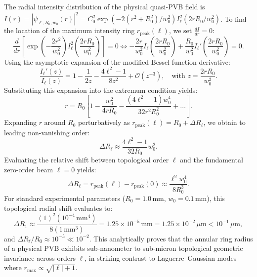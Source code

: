 \documentclass[11pt,a4paper]{article}
\begin{document}
The radial intensity distribution of the physical quasi-PVB field is $I(r) = |\psi_{\ell, R_0, w_0}(r)|^2 = C_0^2 \exp(-2(r^2 + R_0^2)/w_0^2) I_\ell^2(2 r R_0 / w_0^2)$.
To find the location of the maximum intensity ring $r_{\text{peak}}(\ell)$, we set $\frac{d I}{dr} = 0$:
\begin{equation}
\frac{d}{dr} \left[ \exp\left(-\frac{2 r^2}{w_0^2}\right) I_\ell^2\left(\frac{2 r R_0}{w_0^2}\right) \right] = 0 \iff -\frac{2r}{w_0^2} I_\ell\left(\frac{2 r R_0}{w_0^2}\right) + \frac{R_0}{w_0^2} I_\ell'\left(\frac{2 r R_0}{w_0^2}\right) = 0.
\label{eq:app_peak_derivative}
\end{equation}
Using the asymptotic expansion of the modified Bessel function derivative:
\begin{equation}
\frac{I_\ell'(z)}{I_\ell(z)} = 1 - \frac{1}{2z} - \frac{4\ell^2 - 1}{8 z^2} + \mathcal{O}(z^{-3}), \quad \text{with } z = \frac{2 r R_0}{w_0^2}.
\label{eq:app_ratio_bessel_deriv}
\end{equation}
Substituting this expansion into the extremum condition yields:
\begin{equation}
r = R_0 \left[ 1 - \frac{w_0^2}{4 r R_0} - \frac{(4\ell^2 - 1) w_0^4}{32 r^2 R_0^2} + \dots \right].
\label{eq:app_r_expansion}
\end{equation}
Expanding $r$ around $R_0$ perturbatively as $r_{\text{peak}}(\ell) = R_0 + \Delta R_\ell$, we obtain to leading non-vanishing order:
\begin{equation}
\Delta R_\ell \approx \frac{4\ell^2 - 1}{32 R_0} w_0^2.
\label{eq:app_delta_r_ell}
\end{equation}
Evaluating the relative shift between topological order $\ell$ and the fundamental zero-order beam $\ell = 0$ yields:
\begin{equation}
\boxed{\Delta R_\ell = r_{\text{peak}}(\ell) - r_{\text{peak}}(0) \approx \frac{\ell^2 w_0^4}{8 R_0^3}.}
\label{eq:app_delta_r_final}
\end{equation}
For standard experimental parameters ($R_0 = 1.0\,\text{mm}$, $w_0 = 0.1\,\text{mm}$), this topological radial shift evaluates to:
\begin{equation}
\Delta R_1 \approx \frac{(1)^2 (10^{-4}\,\text{mm}^4)}{8 (1\,\text{mm}^3)} = 1.25 \times 10^{-5}\,\text{mm} = 1.25 \times 10^{-2}\,\mu\text{m} < 10^{-1}\,\mu\text{m},
\label{eq:app_shift_eval}
\end{equation}
and $\Delta R_\ell / R_0 \approx 10^{-5} \ll 10^{-2}$.
This analytically proves that the annular ring radius of a physical PVB exhibits sub-nanometer to sub-micron topological geometric invariance across orders $\ell$, in striking contrast to Laguerre--Gaussian modes where $r_{\max} \propto \sqrt{|\ell|+1}$.
\end{document}
